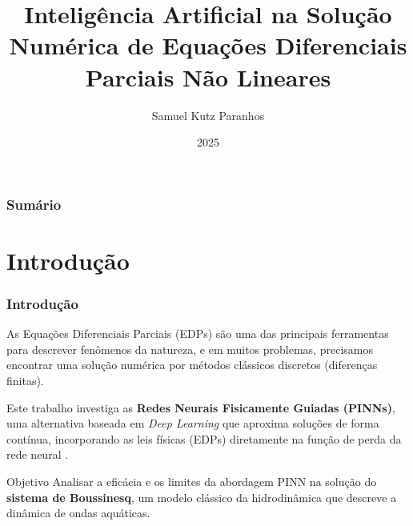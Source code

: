 \documentclass[usenames,dvipsnames,brazil,aspectratio=169]{beamer}
\title{Inteligência Artificial na Solução Numérica de Equações Diferenciais Parciais Não Lineares}
\author{Samuel Kutz Paranhos}
\institute{Orientador: Prof. Roberto Ribeiro \\ Universidade Federal do Paraná}
\date{2025}
\begin{document}
{
    \begin{frame}[plain]
        \maketitle
    \end{frame}
}

\begin{frame}[t]
    \frametitle{Sumário}
    \tableofcontents
\end{frame}

\section{Introdução}

\begin{frame}[t]
    \frametitle{Introdução}
    As Equações Diferenciais Parciais (EDPs) são uma das principais ferramentas para descrever fenômenos da natureza, e em muitos problemas, precisamos encontrar uma solução numérica por métodos clássicos discretos (diferenças finitas).
    \vspace{0.5cm}

    Este trabalho investiga as \textbf{\color{UniBlue}Redes Neurais Fisicamente Guiadas (PINNs)}, uma alternativa baseada em \textit{Deep Learning} que aproxima soluções de forma contínua, incorporando as leis físicas (EDPs) diretamente na função de perda da rede neural \parencite{raissi2017}.
    \vspace{1cm}

    \begin{block}{Objetivo}
        Analisar a eficácia e os limites da abordagem PINN na solução do \textbf{sistema de Boussinesq}, um modelo clássico da hidrodinâmica que descreve a dinâmica de ondas aquáticas.
    \end{block}
\end{frame}
\end{document}

